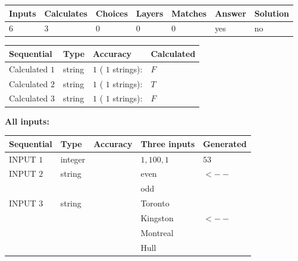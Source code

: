\documentclass[12pt]{article}
\begin{document}
 
 
\noindent{}
 
 

 
\vspace{0.3in}
   
   
   
   
\noindent\begin{tabular}{|l|l|l|l|l|l|l|}
 \hline
Inputs & Calculates & Choices & Layers & Matches & Answer & Solution \\ \hline
           6  & 
           3  & 
           0
  & 
           0  & 
           0  & 
  yes & 
  no 
  \\ \hline
 \end{tabular}
   
   
   
   
\noindent{}
   
   
  
  
\noindent\begin{tabular}{|l|l|l|l|}
\hline
 Sequential & Type & Accuracy & Calculated \\ 
\hline
 
 
  Calculated $            1 $ & string & $            1  $ ( $           1  $ strings): 
 & $F$
 \\  \hline  
 
 
  Calculated $            2 $ & string & $            1  $ ( $           1  $ strings): 
 & $T$
 \\  \hline  
 
 
  Calculated $            3 $ & string & $            1  $ ( $           1  $ strings): 
 & $F$
 \\  \hline  
 \end{tabular}
   
   
   
   
\noindent\vspace{0.1in}\hspace{-0.08in} {\textbf{\Large{All inputs: }}}
   
   
  
  
\noindent\begin{tabular}{|l|l|l|l|l|}
\hline
 Sequential & Type & Accuracy & Three inputs & Generated \\ 
\hline
 
 
  INPUT $            1 $ & integer &  & $
 1
 , 
 100
 , 
 1
 $ & $ 53 $ 
 \\  \hline  
 
 
  INPUT $            2 $ & string & & 
 even & 
  $ <-- $ 
  \\
  & & & 
 odd & 
 \\  \hline  
 
 
  INPUT $            3 $ & string & & 
 Toronto & 
  \\
  & & & 
 Kingston & 
  $ <-- $ 
  \\
  & & & 
 Montreal & 
  \\
  & & & 
 Hull & 
 \\  \hline  
 \end{tabular}
   
\end{document}
